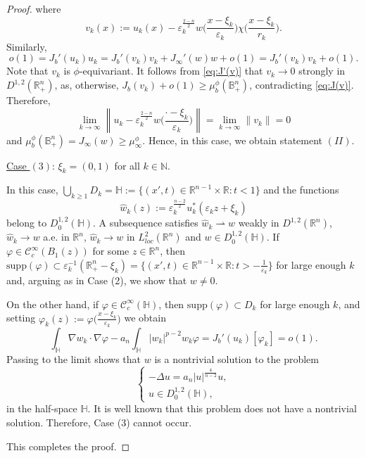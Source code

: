 \documentclass[reqno,11pt,oneside]{amsart}
\numberwithin{equation}{section}
\def\D{\mathbb{B}^n_+}
\def\r{\mathbb{R}}
\def\rn{\mathbb{R}^n}
\def\hn{\mathbb{R}^n_+}
\def\n{\mathbb{N}}
\def\eps{\varepsilon}
\def\rh{\rightharpoonup}
\def\vp{\varphi}
\def\cC{\mathcal{C}}
\def\supp{\mathrm{supp}}
\def\what{\widehat}
\begin{document}
\begin{proof}
where
$$v_k(x):=u_k(x)-\eps_k^\frac{2-n}{2}w\Big(\frac{x-\xi_k}{\eps_k}\Big)\chi\Big(\frac{x-\xi_k}{r_k}\Big).$$
Similarly,
\begin{equation}\label{eq:J'(v)}
o(1)=J_b'(u_k)u_k=J_b'(v_k)v_k + J_\infty'(w)w + o(1)=J_b'(v_k)v_k + o(1).
\end{equation}
Note that $v_k$ is $\phi$-equivariant. It follows from \eqref{eq:J'(v)} that $v_k\to 0$ strongly in $D^{1,2}(\hn)$, as, otherwise, $J_b(v_k)+o(1)\geq\mu_b^\phi(\D)$, contradicting \eqref{eq:J(v)}. Therefore, 
$$\lim_{k\to\infty}\left\|u_k-\eps_k^\frac{2-n}{2}w\Big(\frac{\cdot - \xi_k}{\eps_k}\Big)\right\| = \lim_{k\to\infty}\|v_k\| = 0$$
and $\mu^\phi_b(\D)=J_\infty(w)\geq \mu^\phi_\infty$. Hence, in this case, we obtain statement $(II)$.

\underline{Case $(3)$}: $\xi_k=(0,1)$ for all $k\in\n$.

In this case, $\bigcup_{k\geq 1}D_k=\mathbb{H}:=\{(x',t)\in\r^{n-1}\times\r:t<1\}$ and the functions 
$$\what w_k(z):=\eps_k^\frac{n-2}{2}u_k^*(\eps_kz+\xi_k)$$
belong to $D^{1,2}_0(\mathbb{H})$. A subsequence satisfies $\what w_k\rh w$ weakly in $D^{1,2}(\rn)$, $\what w_k\to w$ a.e. in $\rn$, $\what w_k\to w$ in $L^2_{loc}(\rn)$ and $w\in D^{1,2}_0(\mathbb{H})$. If $\vp\in\cC^\infty_c(B_1(z))$ for some $z\in\rn$, then $\supp(\vp)\subset \eps_k^{-1}(\hn-\xi_k)=\{(x',t)\in\r^{n-1}\times\r:t>-\frac{1}{\eps_k}\} $ for large enough $k$ and, arguing as in Case (2), we show that $w\neq 0$.

On the other hand, if $\vp\in\cC_c^\infty(\mathbb{H})$, then $\supp(\vp)\subset D_k$ for large enough $k$, and setting $\vp_k(z):=\vp\big(\frac{x-\xi_k}{\eps_k}\big)$ we obtain
\begin{equation*}
\int_\mathbb{H}\nabla w_k\cdot\nabla\vp-a_n\int_\mathbb{H}|w_k|^{p-2}w_k\vp = J_b'(u_k)[\vp_k]=o(1).
\end{equation*}
Passing to the limit shows that $w$ is a nontrivial solution to the problem 
\begin{equation*}
\begin{cases}
 -\Delta u = a_n|u|^\frac{4}{n-2}u,\\
 u\in D^{1,2}_0(\mathbb{H}),
\end{cases}
\end{equation*}
in the half-space $\mathbb{H}$. It is well known that this problem does not have a nontrivial solution. Therefore, Case (3) cannot occur.

This completes the proof.
\end{proof}
\end{document}

